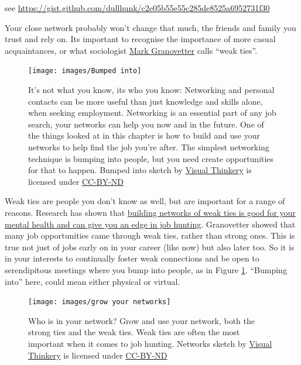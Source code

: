 \documentclass[
]{book}
\begin{document}
see \url{https://gist.github.com/dullhunk/c2e05b55e55c285de8525a6952731f30}

Your close network probably won't change that much, the friends and family you trust and rely on. Its important to recognise the importance of more casual acquaintances, or what sociologist \href{https://en.wikipedia.org/wiki/Mark_Granovetter}{Mark Granovetter} calls ``weak ties''. \citep{granovetter}

\begin{figure}

{\centering \texttt{[image: images/Bumped into]} 

}

\caption{It's not what you know, its who you know: Networking and personal contacts can be more useful than just knowledge and skills alone, when seeking employment. Networking is an essential part of any job search, your networks can help you now and in the future. One of the things looked at in this chapter is how to build and use your networks to help find the job you're after. The simplest networking technique is bumping into people, but you need create opportunities for that to happen. Bumped into sketch by \href{https://visualthinkery.com/}{Visual Thinkery} is licensed under \href{https://creativecommons.org/licenses/by-nd/4.0/}{CC-BY-ND}}\label{fig:bumped-fig}
\end{figure}



Weak ties are people you don't know as well, but are important for a range of reasons. Research has shown that \href{https://www.bbc.com/worklife/article/20200701-why-your-weak-tie-friendships-may-mean-more-than-you-think}{building networks of weak ties is good for your mental health and can give you an edge in job hunting}. \citep{weakties} Granovetter showed that many job opportunities came through weak ties, rather than strong ones. This is true not just of jobs early on in your career (like now) but also later too. So it is in your interests to continually foster weak connections and be open to serendipitous meetings where you bump into people, as in Figure \ref{fig:bumped-fig}. ``Bumping into'' here, could mean either physical or virtual.

\begin{figure}

{\centering \texttt{[image: images/grow your networks]} 

}

\caption{Who is in your network? Grow and use your network, both the strong ties and the weak ties. Weak ties are often the most important when it comes to job hunting. Networks sketch by \href{https://visualthinkery.com/}{Visual Thinkery} is licensed under \href{https://creativecommons.org/licenses/by-nd/4.0/}{CC-BY-ND}}\label{fig:net-fig}
\end{figure}
\end{document}
